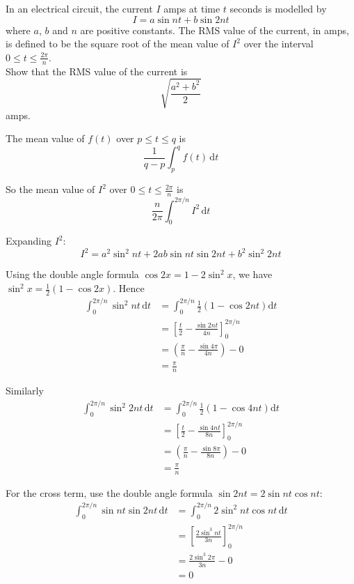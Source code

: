 \documentclass[leqno]{article}
\begin{document}
\begin{enumerate}[
  label=\textbf{\arabic*.},
  leftmargin=*,
  topsep=0pt,
  partopsep=0pt,
  parsep=0pt
]
\newpage

\questionitem

In an electrical circuit, the current $I$ amps at time $t$ seconds is modelled by
\[ I = a\sin nt + b\sin 2nt \]
where $a$, $b$ and $n$ are positive constants. The RMS value of the current, in amps, is defined to be the square root of the mean value of $I^2$ over the interval $0 \le t \le \frac{2\pi}{n}$. \\

Show that the RMS value of the current is
\[\sqrt{\dfrac{a^2+b^2}{2}}\]
amps.  \\

\vspace*{10pt}

\begin{djsSolution}
The mean value of \(f(t)\) over \(p\le t\le q\) is
\[
\dfrac{1}{q-p}\int_p^q f(t)\,\mathrm{d}t
\]

So the mean value of \(I^2\) over \(0 \le t \le \frac{2\pi}{n}\) is
\[
\frac{n}{2\pi}\int_0^{2\pi/n} I^2\,\mathrm{d}t
\]

Expanding \(I^2\):
\[
I^2 = a^2\sin^2 nt + 2ab\sin nt\sin 2nt + b^2\sin^2 2nt
\]

Using the double angle formula \(\cos 2x = 1-2\sin^2 x\), we have \(\sin^2 x = \frac{1}{2}(1-\cos 2x)\). Hence
\begin{align*}
\int_0^{2\pi/n} \sin^2 nt\,\mathrm{d}t &= \int_0^{2\pi/n} \frac{1}{2}\left(1-\cos 2nt\right)\mathrm{d}t\\
&= \left[\frac{t}{2} - \frac{\sin 2nt}{4n}\right]_0^{2\pi/n}\\
&= \left(\frac{\pi}{n} - \frac{\sin 4\pi}{4n}\right) - 0\\
&= \frac{\pi}{n}
\end{align*}

Similarly
\begin{align*}
\int_0^{2\pi/n} \sin^2 2nt\,\mathrm{d}t &= \int_0^{2\pi/n} \frac{1}{2}\left(1-\cos 4nt\right)\mathrm{d}t\\
&= \left[\frac{t}{2} - \frac{\sin 4nt}{8n}\right]_0^{2\pi/n}\\
&= \left(\frac{\pi}{n} - \frac{\sin 8\pi}{8n}\right) - 0\\
&= \frac{\pi}{n}
\end{align*}

For the cross term, use the double angle formula \(\sin 2nt = 2\sin nt\cos nt\):
\begin{align*}
\int_0^{2\pi/n} \sin nt\sin 2nt\,\mathrm{d}t &= \int_0^{2\pi/n} 2\sin^2 nt\cos nt\,\mathrm{d}t\\
&= \left[\frac{2\sin^3 nt}{3n}\right]_0^{2\pi/n}\\
&= \frac{2\sin^3 2\pi}{3n} - 0\\
&= 0
\end{align*}


\end{djsSolution}
\end{enumerate}
\end{document}
